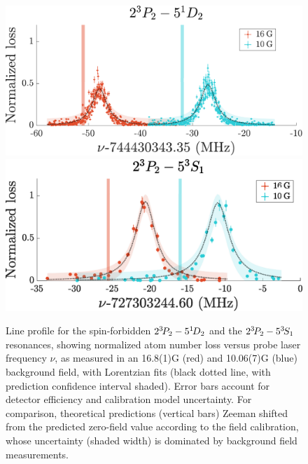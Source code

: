 \begin{figure}
  \begin{minipage}[t]{0.6\textwidth}
  \vspace{0pt}
        \includegraphics[width=\textwidth]{fig/spectroscopy/ci-plot-51D2-eps-converted-to.pdf}
    \includegraphics[width=\textwidth]{fig/spectroscopy/ci-plot-53S1}
  \end{minipage}\hfill
  \begin{minipage}[t]{0.38\textwidth}
  \vspace{0pt}
   \caption{Line profile for the spin-forbidden $2^{3\!}P_2 -  5^{1\!}D_2$ and the $2^{3\!} P_2 - 5^{3\!} S_1$ resonances, showing normalized atom number loss versus probe laser frequency $\nu$, as measured in an {16.8(1)}G (red) and {10.06(7)}G (blue) background field, with Lorentzian fits (black dotted line, with prediction confidence interval shaded).
	Error bars account for detector efficiency and calibration model uncertainty.
	For comparison, theoretical predictions (vertical bars) Zeeman shifted from the predicted zero-field value \cite{Drake07} according to the field calibration, whose uncertainty (shaded width) is dominated by background field measurements.}
    \label{fig:1D_2_line}
  \end{minipage}
\end{figure}


